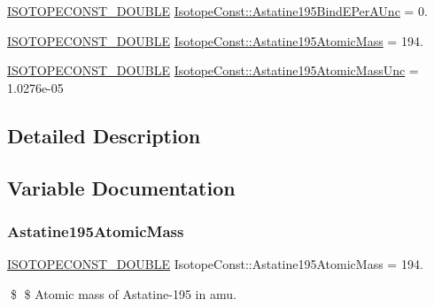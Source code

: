 \begin{DoxyCompactItemize}
\mbox{\hyperlink{group___isotope_const-_macros_ga8f45a7272ce02c0b4c65c44636ed719a}{I\+S\+O\+T\+O\+P\+E\+C\+O\+N\+S\+T\+\_\+\+D\+O\+U\+B\+LE}} \mbox{\hyperlink{group___isotope_const-_astatine-_at195_ga234f45d0df4646fce9d42725d6930636}{Isotope\+Const\+::\+Astatine195\+Bind\+E\+Per\+A\+Unc}} = 0.
\item 
\mbox{\hyperlink{group___isotope_const-_macros_ga8f45a7272ce02c0b4c65c44636ed719a}{I\+S\+O\+T\+O\+P\+E\+C\+O\+N\+S\+T\+\_\+\+D\+O\+U\+B\+LE}} \mbox{\hyperlink{group___isotope_const-_astatine-_at195_gaf37c547b7918d1218e309e75554c2338}{Isotope\+Const\+::\+Astatine195\+Atomic\+Mass}} = 194.
\item 
\mbox{\hyperlink{group___isotope_const-_macros_ga8f45a7272ce02c0b4c65c44636ed719a}{I\+S\+O\+T\+O\+P\+E\+C\+O\+N\+S\+T\+\_\+\+D\+O\+U\+B\+LE}} \mbox{\hyperlink{group___isotope_const-_astatine-_at195_gadf89c0ac9b27bf7577c5fe519015d22d}{Isotope\+Const\+::\+Astatine195\+Atomic\+Mass\+Unc}} = 1.\+0276e-\/05
\end{DoxyCompactItemize}


\subsection{Detailed Description}


\subsection{Variable Documentation}
\mbox{\label{group___isotope_const-_astatine-_at195_gaf37c547b7918d1218e309e75554c2338}} 
\subsubsection{\texorpdfstring{Astatine195\+Atomic\+Mass}{Astatine195AtomicMass}}
{\footnotesize\ttfamily \mbox{\hyperlink{group___isotope_const-_macros_ga8f45a7272ce02c0b4c65c44636ed719a}{I\+S\+O\+T\+O\+P\+E\+C\+O\+N\+S\+T\+\_\+\+D\+O\+U\+B\+LE}} Isotope\+Const\+::\+Astatine195\+Atomic\+Mass = 194.}

\$ \$ Atomic mass of Astatine-\/195 in amu. \mbox{\label{group___isotope_const-_astatine-_at195_gadf89c0ac9b27bf7577c5fe519015d22d}} 
